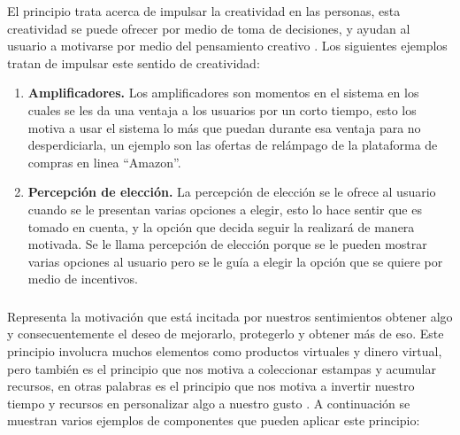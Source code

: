  El principio trata acerca de impulsar la creatividad en las personas, esta creatividad
 se puede ofrecer por medio de toma de decisiones, y ayudan al usuario a motivarse por medio
 del pensamiento creativo \cite[p. 126]{Octalysis}. Los siguientes ejemplos tratan de impulsar
 este sentido de creatividad:
    
    \begin{enumerate}
    \item
    {\bf Amplificadores.} \cite[p. 146]{Octalysis}
        Los amplificadores son momentos en el sistema en los cuales se les da una ventaja a los
        usuarios por un corto tiempo, esto los motiva a usar el sistema lo más que puedan durante
        esa ventaja para no desperdiciarla, un ejemplo son las ofertas de relámpago de la
        plataforma de compras en linea ``Amazon''.
        
    \item
    {\bf Percepción de elección.} \cite[p. 150]{Octalysis}
        La percepción de elección se le ofrece al usuario cuando se le presentan varias opciones
        a elegir, esto lo hace sentir que es tomado en cuenta, y la opción que decida seguir la
        realizará de manera motivada. Se le llama percepción de elección porque se le pueden
        mostrar varias opciones al usuario pero se le guía a elegir la opción que se quiere por
        medio de incentivos.
    \end{enumerate}
    
\subsubsection{\principioIV} \label{subsec:principioIV}
    
 Representa la motivación que está incitada por nuestros sentimientos obtener algo y consecuentemente el
 deseo de mejorarlo, protegerlo y obtener más de eso. Este principio involucra muchos elementos como
 productos virtuales y dinero virtual, pero también es el principio que nos motiva a coleccionar estampas
 y acumular recursos, en otras palabras es el principio que nos motiva a invertir nuestro tiempo
 y recursos en personalizar algo a nuestro gusto \cite[p. 161]{Octalysis}. A continuación se muestran
 varios ejemplos de componentes que pueden aplicar este principio:
    
